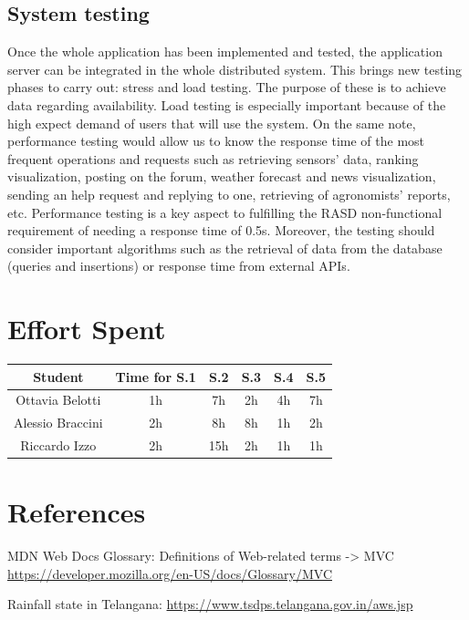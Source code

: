 \documentclass[table, 12pt]{article}
\begin{document}
\subsection{System testing}
Once the whole application has been implemented and tested, the application server can be integrated in the whole distributed system. This brings new testing phases to carry out: stress and load testing. The purpose of these is to achieve data regarding availability. Load testing is especially important because of the high expect demand of users that will use the system. On the same note, performance testing would allow us to know the response time of the most frequent operations and requests such as retrieving sensors' data, ranking visualization, posting on the forum, weather forecast and news visualization, sending an help request and replying to one, retrieving of agronomists' reports, etc. Performance testing is a key aspect to fulfilling the RASD non-functional requirement of needing a response time of 0.5s. Moreover, the testing should consider important algorithms such as the retrieval of data from the database (queries and insertions) or response time from external APIs.

\newpage
\section{Effort Spent}
    \begin{tabular}{|c||c|c|c|c|c|}
        \hline
        Student & Time for S.1 & S.2 & S.3 & S.4 & S.5\\ \hline
        Ottavia Belotti & 1h & 7h & 2h & 4h & 7h \\
        Alessio Braccini & 2h & 8h & 8h & 1h  & 2h \\
        Riccardo Izzo & 2h & 15h & 2h & 1h  & 1h \\
        \hline
    \end{tabular}


\section{References}


\begin{thebibliography}{9}
    MDN Web Docs Glossary: Definitions of Web-related terms -> MVC
    \url{https://developer.mozilla.org/en-US/docs/Glossary/MVC}

    Rainfall state in Telangana: \url{https://www.tsdps.telangana.gov.in/aws.jsp}
    
\end{thebibliography}
\end{document}
